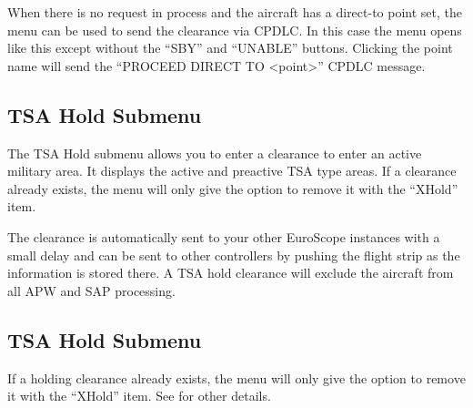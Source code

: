 \documentclass[11pt,a4paper]{memoir}
\begin{document}
When there is no request in process and the aircraft has a direct-to point set, the menu
can be used to send the clearance via CPDLC. In this case the menu opens like this except
without the “SBY” and “UNABLE” buttons. Clicking the point name will send the
“PROCEED DIRECT TO <point>” CPDLC message.

\subsection*{TSA Hold Submenu}
The TSA Hold submenu allows you to enter a clearance to enter an active military area. It displays the active
and preactive TSA type areas. If a clearance already exists, the menu will only give the option to remove it
with the “XHold” item.

The clearance is automatically sent to your other EuroScope instances with a small delay and can be sent to
other controllers by pushing the flight strip as the information is stored there. A TSA hold clearance will
exclude the aircraft from all APW and SAP processing.

\subsection*{TSA Hold Submenu}
If a holding clearance already exists, the menu will only give the option to remove it with the “XHold” item.
See \textit{} for other details.
\end{document}
